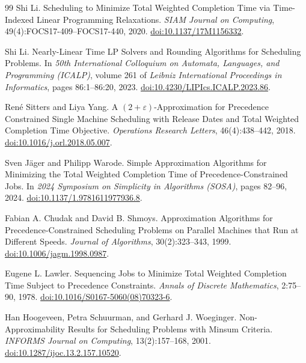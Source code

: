 \begin{thebibliography}{99}
Shi Li.
\newblock Scheduling to Minimize Total Weighted Completion Time via
Time-Indexed Linear Programming Relaxations.
\newblock \emph{SIAM Journal on Computing}, 49(4):FOCS17-409--FOCS17-440,
2020.
\newblock \href{https://doi.org/10.1137/17M1156332}
{doi:10.1137/17M1156332}.

Shi Li.
\newblock Nearly-Linear Time LP Solvers and Rounding Algorithms for
Scheduling Problems.
\newblock In \emph{50th International Colloquium on Automata, Languages,
and Programming (ICALP)}, volume 261 of \emph{Leibniz International
Proceedings in Informatics}, pages 86:1--86:20, 2023.
\newblock \href{https://doi.org/10.4230/LIPIcs.ICALP.2023.86}
{doi:10.4230/LIPIcs.ICALP.2023.86}.

Ren\'e Sitters and Liya Yang.
\newblock A $(2+\varepsilon)$-Approximation for Precedence Constrained Single
Machine Scheduling with Release Dates and Total Weighted Completion Time
Objective.
\newblock \emph{Operations Research Letters}, 46(4):438--442, 2018.
\newblock \href{https://doi.org/10.1016/j.orl.2018.05.007}
{doi:10.1016/j.orl.2018.05.007}.

Sven J\"ager and Philipp Warode.
\newblock Simple Approximation Algorithms for Minimizing the Total Weighted
Completion Time of Precedence-Constrained Jobs.
\newblock In \emph{2024 Symposium on Simplicity in Algorithms (SOSA)},
pages 82--96, 2024.
\newblock \href{https://doi.org/10.1137/1.9781611977936.8}
{doi:10.1137/1.9781611977936.8}.

Fabian A. Chudak and David B. Shmoys.
\newblock Approximation Algorithms for Precedence-Constrained Scheduling
Problems on Parallel Machines that Run at Different Speeds.
\newblock \emph{Journal of Algorithms}, 30(2):323--343, 1999.
\newblock \href{https://doi.org/10.1006/jagm.1998.0987}
{doi:10.1006/jagm.1998.0987}.

Eugene L. Lawler.
\newblock Sequencing Jobs to Minimize Total Weighted Completion Time Subject
to Precedence Constraints.
\newblock \emph{Annals of Discrete Mathematics}, 2:75--90, 1978.
\newblock \href{https://doi.org/10.1016/S0167-5060(08)70323-6}
{doi:10.1016/S0167-5060(08)70323-6}.

Han Hoogeveen, Petra Schuurman, and Gerhard J. Woeginger.
\newblock Non-Approximability Results for Scheduling Problems with Minsum
Criteria.
\newblock \emph{INFORMS Journal on Computing}, 13(2):157--168, 2001.
\newblock \href{https://doi.org/10.1287/ijoc.13.2.157.10520}
{doi:10.1287/ijoc.13.2.157.10520}.


\end{thebibliography}
